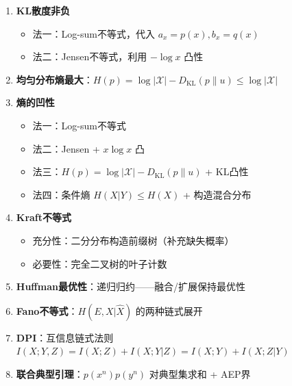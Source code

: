 \documentclass[12pt,a4paper]{ctexart}
\theoremstyle{definition}
\newcommand{\XX}{\mathcal{X}}
\newcommand{\DKL}{D_{\mathrm{KL}}}
\begin{document}
\begin{enumerate}[label=\textbf{\arabic*.}, leftmargin=*]

  \item \textbf{KL散度非负}
  \begin{itemize}[nosep]
    \item 法一：Log-sum不等式，代入 $a_x = p(x), b_x = q(x)$
    \item 法二：Jensen不等式，利用 $-\log x$ 凸性
  \end{itemize}

  \item \textbf{均匀分布熵最大}：$H(p) = \log|\XX| - \DKL(p\|u) \leq \log|\XX|$

  \item \textbf{熵的凹性}
  \begin{itemize}[nosep]
    \item 法一：Log-sum不等式
    \item 法二：Jensen + $x\log x$ 凸
    \item 法三：$H(p) = \log|\XX| - \DKL(p\|u)$ + KL凸性
    \item 法四：条件熵 $H(X|Y) \leq H(X)$ + 构造混合分布
  \end{itemize}

  \item \textbf{Kraft不等式}
  \begin{itemize}[nosep]
    \item 充分性：二分分布构造前缀树（补充缺失概率）
    \item 必要性：完全二叉树的叶子计数
  \end{itemize}

  \item \textbf{Huffman最优性}：递归归约——融合/扩展保持最优性

  \item \textbf{Fano不等式}：$H(E,X|\hat{X})$ 的两种链式展开

  \item \textbf{DPI}：互信息链式法则 $I(X;Y,Z) = I(X;Z) + I(X;Y|Z) = I(X;Y) + I(X;Z|Y)$

  \item \textbf{联合典型引理}：$p(x^n)p(y^n)$ 对典型集求和 + AEP界


\end{enumerate}
\end{document}
